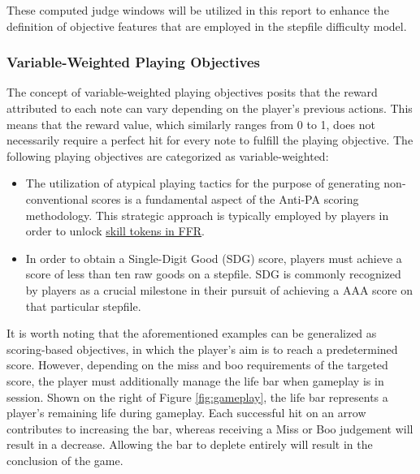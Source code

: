 \vspace{2mm}

These computed judge windows will be utilized in this report to enhance the definition of objective features that are employed in the stepfile difficulty model.

\subsubsection{Variable-Weighted Playing Objectives}

The concept of variable-weighted playing objectives posits that the reward attributed to each note can vary depending on the player's previous actions. This means that the reward value, which similarly ranges from 0 to 1, does not necessarily require a perfect hit for every note to fulfill the playing objective. The following playing objectives are categorized as variable-weighted:

\begin{itemize}
    \item The utilization of atypical playing tactics for the purpose of generating non-conventional scores is a fundamental aspect of the Anti-PA scoring methodology. This strategic approach is typically employed by players in order to unlock \href{https://www.flashflashrevolution.com/tokens/skill_token_info.php}{skill tokens in FFR}.

    \item In order to obtain a Single-Digit Good (SDG) score, players must achieve a score of less than ten raw goods on a stepfile. SDG is commonly recognized by players as a crucial milestone in their pursuit of achieving a AAA score on that particular stepfile.
\end{itemize}



It is worth noting that the aforementioned examples can be generalized as scoring-based objectives, in which the player's aim is to reach a predetermined score. However, depending on the miss and boo requirements of the targeted score, the player must additionally manage the life bar when gameplay is in session. Shown on the right of Figure \ref{fig:gameplay}, the life bar represents a player's remaining life during gameplay. Each successful hit on an arrow contributes to increasing the bar, whereas receiving a Miss or Boo judgement will result in a decrease. Allowing the bar to deplete entirely will result in the conclusion of the game.


